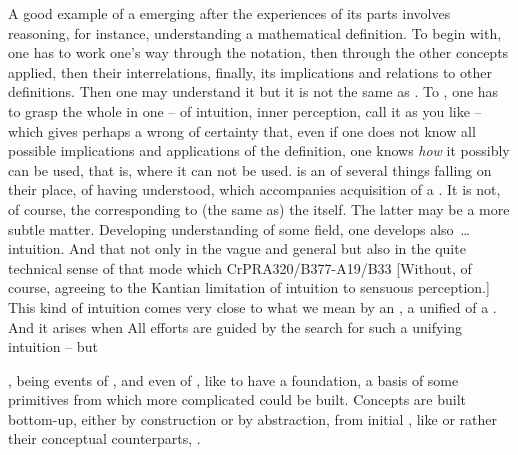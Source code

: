 A good example of a  emerging after the experiences of its parts
involves reasoning, for instance, understanding a mathematical definition.  To
begin with, one has to work one's way through the notation, then through the other
concepts applied, then their interrelations, finally, its implications and
relations to other definitions.  Then one may understand it but it is not the same
as .  To , one has to grasp the whole in one 
-- of intuition, inner perception, call it as you like -- which gives perhaps
a wrong  of certainty that, even if one does not know all possible
implications and applications of the definition, one knows {\em how} it possibly
can be used, that is, where it can not be used.   is an
 of several things falling on their place, of having understood,
which accompanies acquisition of a . It is not, of course, the
 corresponding to (the same  as) the 
itself. The latter may be a more subtle matter. Developing understanding of some
field, one develops also~\ldots intuition. And that not only in the vague and
general but also in the quite technical sense of that mode which \citet{relates
  immediately to the object, and is single. [...]  In whatsoever mode, or by
  whatsoever means, our knowledge may relate to objects, it is at least quite
  clear that the only manner in which it immediately relates to them is by means
  of an intuition.}{CrPR}{A320/B377-A19/B33 [Without,
  of course, agreeing to the Kantian limitation of intuition to sensuous
  perception.]} This kind of intuition comes very close to what we mean by an
, a unified  of a . And it arises when
  All  efforts are
guided by the search for such a unifying intuition -- but 




\pa
{}, being events of , and even 
of , like to have a  
foundation, a basis of some primitives from which more 
complicated  could be built.
Concepts are built bottom-up, either by construction or by abstraction, from
initial , like  or rather their conceptual
counterparts, .

